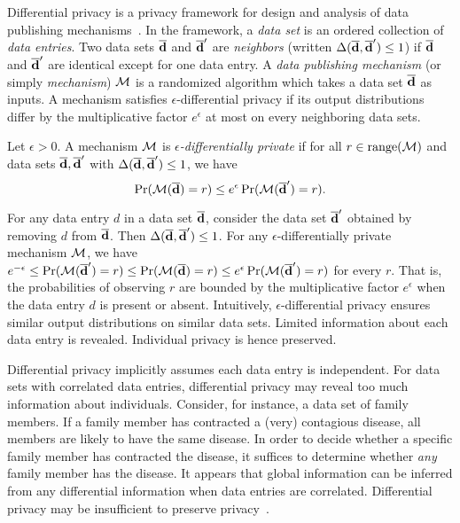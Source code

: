 
Differential privacy is a privacy framework for design and analysis of
data publishing mechanisms~\cite{D:06:DP,DR:14:AFDP}. In the
framework, a \emph{data set} is an 
ordered collection of \emph{data entries}. Two data sets $\overline{\mathbf{d}}$ and
$\overline{\mathbf{d}}'$ are \emph{neighbors} (written $\Delta (\overline{\mathbf{d}}, \overline{\mathbf{d}}') \leq 1$) if
$\overline{\mathbf{d}}$ and $\overline{\mathbf{d}}'$ are identical except for one data entry. A \emph{data
publishing mechanism} (or simply \emph{mechanism}) $\mathcal{M}$ is a
randomized algorithm which takes a data set $\overline{\mathbf{d}}$ as inputs. A
mechanism satisfies $\epsilon$-differential privacy if its output
distributions differ by the multiplicative factor $e^\epsilon$  at
most on
every neighboring data sets. 

\begin{definition}
  Let $\epsilon > 0$. A mechanism $\mathcal{M}$ is
  \emph{$\epsilon$-differentially private} if for all $r \in
  \textmd{range}(\mathcal{M})$ and data sets $\overline{\mathbf{d}}, \overline{\mathbf{d}}'$ with $\Delta (\overline{\mathbf{d}},
  \overline{\mathbf{d}}') \leq 1$, we have
  \[
    \Pr (\mathcal{M} (\overline{\mathbf{d}}) = r) \leq e^{\epsilon} \Pr (\mathcal{M} (\overline{\mathbf{d}}') = r).
  \]
\end{definition}

For any data entry $d$ in a data
set $\overline{\mathbf{d}}$, consider the data set $\overline{\mathbf{d}}'$ obtained by removing $d$ from
$\overline{\mathbf{d}}$. Then $\Delta (\overline{\mathbf{d}}, \overline{\mathbf{d}}') \leq 1$. For any
$\epsilon$-differentially private mechanism $\mathcal{M}$, we have
$e^{-\epsilon} \leq \Pr (\mathcal{M} (\overline{\mathbf{d}}') = r) \leq \Pr (\mathcal{M} (\overline{\mathbf{d}}) = r)
\leq e^{\epsilon} \Pr (\mathcal{M} (\overline{\mathbf{d}}') = r)$ for every $r$. That is, the
probabilities of observing $r$ are bounded by the multiplicative
factor $e^{\epsilon}$ when the data entry $d$ is present or absent. 
Intuitively, $\epsilon$-differential privacy ensures similar output
distributions on similar data sets. Limited information about each
data entry is revealed. Individual privacy is hence preserved.

Differential privacy implicitly assumes each data entry is
independent. For data sets with correlated data entries, differential
privacy may reveal too much information about individuals. Consider,
for instance, a data set of family members. If a family member has
contracted a (very) contagious disease, all members are likely to have
the same disease. In order to decide whether a specific family member
has contracted the disease, it suffices to determine whether
\emph{any} family member has the disease. It appears that global
information can be inferred from any differential information
when data entries are correlated. Differential privacy may be
insufficient to preserve privacy~\cite{KM:11:NFLDP}.

